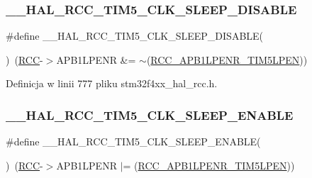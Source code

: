 \subsubsection{\texorpdfstring{\+\_\+\+\_\+\+H\+A\+L\+\_\+\+R\+C\+C\+\_\+\+T\+I\+M5\+\_\+\+C\+L\+K\+\_\+\+S\+L\+E\+E\+P\+\_\+\+D\+I\+S\+A\+B\+LE}{\_\_HAL\_RCC\_TIM5\_CLK\_SLEEP\_DISABLE}}
{\footnotesize\ttfamily \#define \+\_\+\+\_\+\+H\+A\+L\+\_\+\+R\+C\+C\+\_\+\+T\+I\+M5\+\_\+\+C\+L\+K\+\_\+\+S\+L\+E\+E\+P\+\_\+\+D\+I\+S\+A\+B\+LE(\begin{DoxyParamCaption}{ }\end{DoxyParamCaption})~(\hyperlink{group___peripheral__declaration_ga74944438a086975793d26ae48d5882d4}{R\+CC}-\/$>$A\+P\+B1\+L\+P\+E\+NR \&= $\sim$(\hyperlink{group___peripheral___registers___bits___definition_ga5741a6c45b9de1d0c927beb87f399dd9}{R\+C\+C\+\_\+\+A\+P\+B1\+L\+P\+E\+N\+R\+\_\+\+T\+I\+M5\+L\+P\+EN}))}



Definicja w linii 777 pliku stm32f4xx\+\_\+hal\+\_\+rcc.\+h.

\mbox{\label{group___r_c_c___a_p_b1___low_power___enable___disable_gae99e46f9e40655dc9b5c07b03fdc4a4e}} 
\subsubsection{\texorpdfstring{\+\_\+\+\_\+\+H\+A\+L\+\_\+\+R\+C\+C\+\_\+\+T\+I\+M5\+\_\+\+C\+L\+K\+\_\+\+S\+L\+E\+E\+P\+\_\+\+E\+N\+A\+B\+LE}{\_\_HAL\_RCC\_TIM5\_CLK\_SLEEP\_ENABLE}}
{\footnotesize\ttfamily \#define \+\_\+\+\_\+\+H\+A\+L\+\_\+\+R\+C\+C\+\_\+\+T\+I\+M5\+\_\+\+C\+L\+K\+\_\+\+S\+L\+E\+E\+P\+\_\+\+E\+N\+A\+B\+LE(\begin{DoxyParamCaption}{ }\end{DoxyParamCaption})~(\hyperlink{group___peripheral__declaration_ga74944438a086975793d26ae48d5882d4}{R\+CC}-\/$>$A\+P\+B1\+L\+P\+E\+NR $\vert$= (\hyperlink{group___peripheral___registers___bits___definition_ga5741a6c45b9de1d0c927beb87f399dd9}{R\+C\+C\+\_\+\+A\+P\+B1\+L\+P\+E\+N\+R\+\_\+\+T\+I\+M5\+L\+P\+EN}))}



